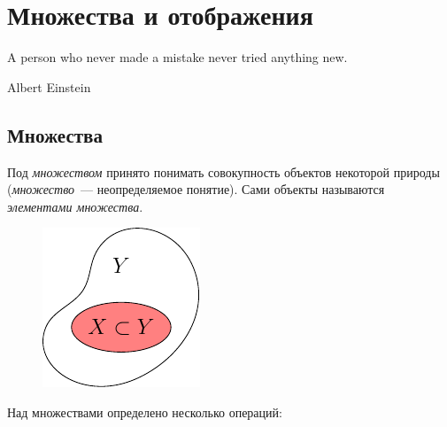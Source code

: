 \section{Множества и отображения}
\label{sets}
\epigraph{A person who never made a mistake never tried anything new.}{Albert Einstein }

\subsection{Множества}

\begin{df}
	Под \emph{множеством} принято понимать совокупность объектов
	некоторой природы (\emph{множество}~--- неопределяемое понятие). Сами объекты
	называются \emph{элемен\-та\-ми множества}.
\end{df}

\begin{figure}
	\includegraphics{graph/x-subset-y}
\end{figure}

Над множествами определено несколько операций:

